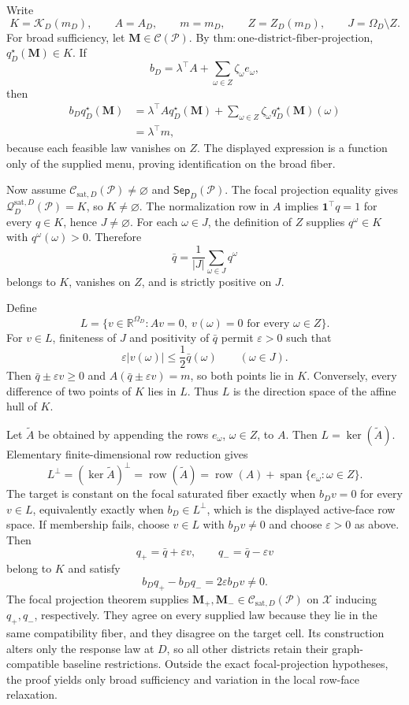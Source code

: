 Write
\[
K=\mathcal K_D(m_D),\qquad A=A_D,\qquad m=m_D,
\qquad Z=Z_D(m_D),\qquad J=\Omega_D\setminus Z.
\]
For broad sufficiency, let \(\mathbf M\in\mathcal C(\mathcal P)\).  By \(\mathrm{thm:one\text{-}district\text{-}fiber\text{-}projection}\), \(q_D^\star(\mathbf M)\in K\).  If
\[
b_D=\lambda^\top A+
\sum_{\omega\in Z}\zeta_\omega e_\omega,
\]
then
\[
\begin{aligned}
b_Dq_D^\star(\mathbf M)
&=\lambda^\top A q_D^\star(\mathbf M)
+\sum_{\omega\in Z}\zeta_\omega q_D^\star(\mathbf M)(\omega)\\
&=\lambda^\top m,
\end{aligned}
\]
because each feasible law vanishes on \(Z\).  The displayed expression is a function only of the supplied menu, proving identification on the broad fiber.

Now assume \(\mathcal C_{\mathrm{sat},D}(\mathcal P)\ne\varnothing\) and \(\mathsf{Sep}_D(\mathcal P)\).  The focal projection equality gives \(\mathcal Q_D^{\mathrm{sat},D}(\mathcal P)=K\), so \(K\ne\varnothing\).  The normalization row in \(A\) implies \(\mathbf 1^\top q=1\) for every \(q\in K\), hence \(J\ne\varnothing\).  For each \(\omega\in J\), the definition of \(Z\) supplies \(q^\omega\in K\) with \(q^\omega(\omega)>0\).  Therefore
\[
\bar q=\frac{1}{\lvert J\rvert}\sum_{\omega\in J}q^\omega
\]
belongs to \(K\), vanishes on \(Z\), and is strictly positive on \(J\).

Define
\[
L=\{v\in\mathbb R^{\Omega_D}:Av=0,
\ v(\omega)=0\text{ for every }\omega\in Z\}.
\]
For \(v\in L\), finiteness of \(J\) and positivity of \(\bar q\) permit \(\varepsilon>0\) such that
\[
\varepsilon\lvert v(\omega)\rvert\leq\frac12\bar q(\omega)
\qquad(\omega\in J).
\]
Then \(\bar q\pm\varepsilon v\geq0\) and \(A(\bar q\pm\varepsilon v)=m\), so both points lie in \(K\).  Conversely, every difference of two points of \(K\) lies in \(L\).  Thus \(L\) is the direction space of the affine hull of \(K\).

Let \(\widetilde A\) be obtained by appending the rows \(e_\omega\), \(\omega\in Z\), to \(A\).  Then \(L=\ker(\widetilde A)\).  Elementary finite-dimensional row reduction gives
\[
L^\perp=(\ker\widetilde A)^\perp
=\operatorname{row}(\widetilde A)
=\operatorname{row}(A)+\operatorname{span}\{e_\omega:\omega\in Z\}.
\]
The target is constant on the focal saturated fiber exactly when \(b_Dv=0\) for every \(v\in L\), equivalently exactly when \(b_D\in L^\perp\), which is the displayed active-face row space.  If membership fails, choose \(v\in L\) with \(b_Dv\ne0\) and choose \(\varepsilon>0\) as above.  Then
\[
q_+=\bar q+\varepsilon v,
\qquad q_-=\bar q-\varepsilon v
\]
belong to \(K\) and satisfy
\[
b_Dq_+-b_Dq_-=2\varepsilon b_Dv\ne0.
\]
The focal projection theorem supplies \(\mathbf M_+,\mathbf M_-\in\mathcal C_{\mathrm{sat},D}(\mathcal P)\) on \(\mathcal X\) inducing \(q_+,q_-\), respectively.  They agree on every supplied law because they lie in the same compatibility fiber, and they disagree on the target cell.  Its construction alters only the response law at \(D\), so all other districts retain their graph-compatible baseline restrictions.  Outside the exact focal-projection hypotheses, the proof yields only broad sufficiency and variation in the local row-face relaxation.